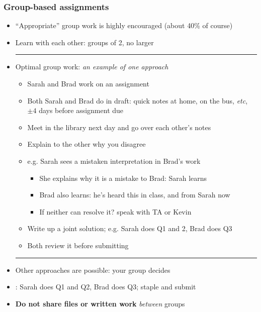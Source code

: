 \begin{frame}\frametitle{Group-based assignments}
	\begin{itemize}
		\item	``Appropriate'' group work is highly encouraged (about 40\% of course)
		\item	Learn with each other: groups of 2, no larger
		\vspace{2pt}\hrule\vspace{2pt}
		\item	Optimal group work: \emph{an example of one approach}
			\begin{itemize}
				\item	Sarah and Brad work on an assignment
				\item	Both Sarah and Brad do {} in draft: quick notes at home, on the bus, \emph{etc}, $\pm 4$ days before assignment due
				\pause
				\item	Meet in the library next day and go over each other's notes
				\item	Explain to the other why you disagree
				\item	e.g. Sarah sees a mistaken interpretation in Brad's work
				\begin{itemize}
					\item	She explains why it is a mistake to Brad: Sarah learns
					\item	Brad also learns: he's heard this in class, and from Sarah now
					\item	If neither can resolve it? speak with TA or Kevin					
				\end{itemize}
				\pause
				\item	Write up a joint solution; e.g. Sarah does Q1 and 2, Brad does Q3
				\item	Both review it before submitting
			\end{itemize}
		\vspace{2pt}\hrule\vspace{2pt}
		\pause		
		\item	Other approaches are possible: your group decides
		\item	\color{myOrange}{What doesn't work}: Sarah does Q1 and Q2, Brad does Q3; staple and submit
		\item	\textbf{Do not share files or written work} \emph{between} groups 
	\end{itemize}
\end{frame}

